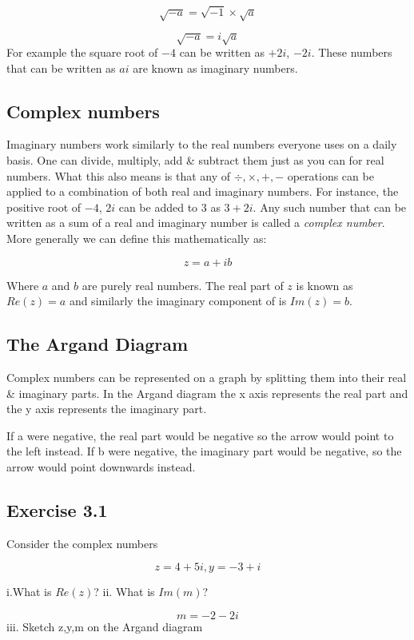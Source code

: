 \documentclass{book}
\begin{document}
$$ \sqrt{-a} = \sqrt{-1} \times \sqrt{a} $$

$$ \sqrt{-a} = i \sqrt{a} $$
For example the square root of $-4$ can be written as $+2i$, $-2i$.
These numbers that can be written as $ai$ are known as imaginary numbers. 

\subsection{ Complex numbers}

Imaginary numbers work similarly to the real numbers everyone uses on a  daily basis. One can divide, multiply, add \& subtract them just as you can for real numbers. What this also means is that any of $ \div ,\times, +, - $ operations can be applied to a combination of both real and imaginary numbers. For instance, the positive root of $-4$, $2i$ can be added to $3$ as $3 + 2i $. Any such number that can be written as a sum of a real and imaginary number is called a \textit{complex number}. More generally we can define this mathematically as:

$$ z = a + ib $$

Where $a$ and $b$ are purely real numbers. The real part of $z$ is known as $ Re(z) = a$ and similarly the imaginary component of is $ Im(z) = b$. 

\subsection{ The Argand Diagram}

Complex numbers can be represented on a graph by splitting them into their real \& imaginary parts. In the Argand diagram the x axis represents the real part and the y axis represents the imaginary part. 



If a were negative, the real part would be negative so the arrow would point to the left instead. If b were negative, the imaginary part would be negative, so the arrow would point downwards instead. 


\subsection{Exercise 3.1}

Consider the complex numbers 

$$ z = 4 + 5i , y = -3 + i $$

i.What is $Re(z)$? 
ii. What is $Im(m)$? 

$$m = -2 - 2i $$ 
iii. Sketch z,y,m on the Argand diagram 
\end{document}
